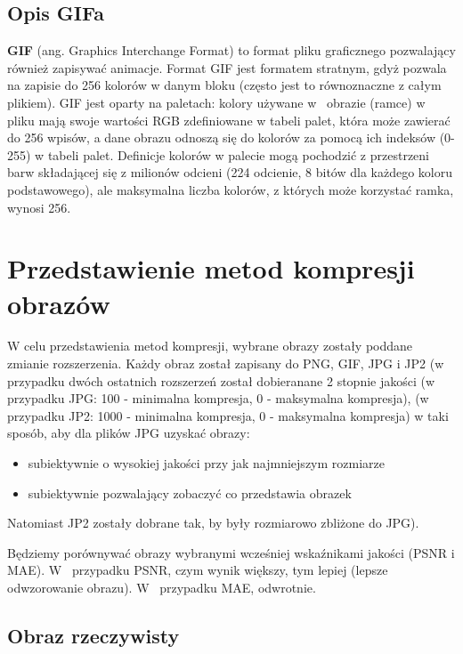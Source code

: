 \documentclass[a4paper, 12pt]{article}
\begin{document}
\subsection{Opis GIFa} 
\textbf{GIF} (ang. Graphics Interchange Format) to format pliku graficznego pozwalający również zapisywać animacje.
Format GIF jest formatem stratnym, gdyż pozwala na zapisie do 256 kolorów w danym bloku (często jest to równoznaczne
z całym plikiem). GIF jest oparty na paletach: kolory używane w~ obrazie (ramce) w pliku mają swoje wartości RGB zdefiniowane 
w tabeli palet, która może zawierać do 256 wpisów, a dane obrazu odnoszą się do kolorów za pomocą ich indeksów (0-255)   
w tabeli palet. 
Definicje kolorów w palecie mogą pochodzić z przestrzeni barw składającej się z milionów odcieni (224 odcienie, 8 bitów dla każdego 
koloru podstawowego), ale maksymalna liczba kolorów, z których może korzystać ramka, wynosi 256. 


\section{Przedstawienie metod kompresji obrazów}

W celu przedstawienia metod kompresji, wybrane obrazy zostały poddane zmianie rozszerzenia. Każdy obraz został zapisany do PNG, GIF,
JPG i JP2 (w przypadku dwóch ostatnich rozszerzeń został dobieranane 2 stopnie jakości (w przypadku JPG: 100 - minimalna kompresja,
0 - maksymalna kompresja), (w przypadku JP2: 1000 - minimalna kompresja, 0 - maksymalna  kompresja) w taki sposób, aby dla plików JPG
uzyskać obrazy: 
\begin{itemize}
\setlength\itemsep{-0.2cm}
 \item subiektywnie o wysokiej jakości przy jak najmniejszym rozmiarze
 \item subiektywnie pozwalający zobaczyć co przedstawia obrazek
\end{itemize}
Natomiast JP2 zostały dobrane tak, by były rozmiarowo zbliżone do JPG). \vspace*{-0.5cm}\\

\begin{flushleft}
Będziemy porównywać obrazy wybranymi wcześniej wskaźnikami jakości (PSNR i MAE). 
W~ przypadku PSNR, czym wynik większy, tym lepiej (lepsze odwzorowanie obrazu). 
W~ przypadku MAE, odwrotnie.
\end{flushleft}


\subsection{Obraz rzeczywisty}
\end{document}
